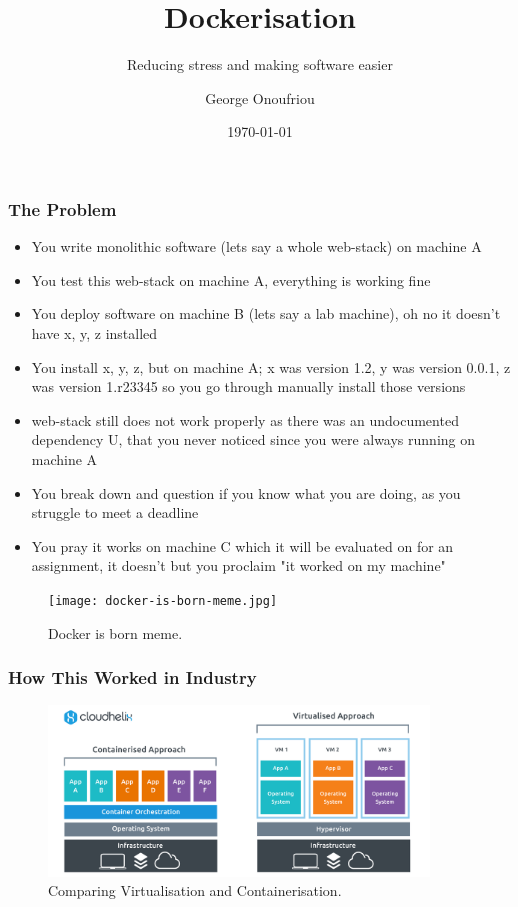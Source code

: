 \documentclass{beamer}
\title{Dockerisation}
\subtitle{Reducing stress and making software easier}
\author{George Onoufriou}
\date{\today}
\begin{document}
  \frame{\titlepage}

  \begin{frame}
    \frametitle{The Problem}
    \begin{itemize}
        \item You write monolithic software (lets say a whole web-stack) on machine A
        \item You test this web-stack on machine A, everything is working fine
        \item You deploy software on machine B (lets say a lab machine), oh no it doesn't have x, y, z installed
        \item You install x, y, z, but on machine A; x was version 1.2, y was version 0.0.1, z was version 1.r23345 so you go through manually install those versions
        \item web-stack still does not work properly as there was an undocumented dependency U, that you never noticed since you were always running on machine A
        \item You break down and question if you know what you are doing, as you struggle to meet a deadline
        \item You pray it works on machine C which it will be evaluated on for an assignment, it doesn't but you proclaim "it worked on my machine"
    \end{itemize}
  \end{frame}

  \begin{frame}
    \begin{figure}[th!]
      \centering
      \texttt{[image: docker-is-born-meme.jpg]}
      \caption{Docker is born meme.}
      \label{fig:docker_born}
    \end{figure}
  \end{frame}

  \begin{frame}
    \frametitle{How This Worked in Industry}
    \begin{figure}[th!]
      \centering
      \includegraphics[width=0.9\textwidth]{containerisation.png}
      \caption{Comparing Virtualisation and Containerisation.}
      \label{fig:containerisation}
    \end{figure}
  \end{frame}
\end{document}

